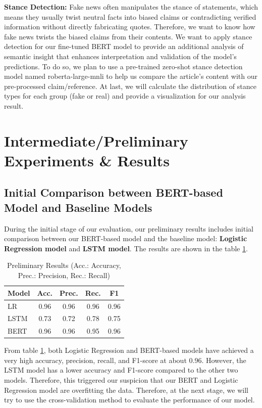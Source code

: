 \documentclass[11pt,a4paper]{article}
\begin{document}
\textbf{Stance Detection:} 
Fake news often manipulates the stance of statements, which means they usually twist neutral facts into biased claims or contradicting verified information without directly fabricating quotes. Therefore, we want to know how fake news twists the biased claims from their contents. We want to apply stance detection for our fine-tuned BERT model to provide an additional analysis of semantic insight that enhances interpretation and validation of the model's predictions.
To do so, we plan to use a pre-trained zero-shot stance detection model named  roberta-large-mnli to help us compare the article's content with our pre-processed claim/reference.
At last, we will calculate the distribution of stance types for each group (fake or real) and provide a visualization for our analysis result.


\section{Intermediate/Preliminary Experiments \& Results}

\subsection{Initial Comparison between BERT-based Model and Baseline Models}
During the initial stage of our evaluation, our preliminary results includes initial comparison between our BERT-based model and the baseline model: \textbf{Logistic Regression model} and \textbf{LSTM model}. The results are shown in the table \ref{tab:preliminary_results}.

\begin{table}[h]
    \centering
    \small
    \begin{tabular}{lcccc}
        \toprule
        Model & Acc. & Prec. & Rec. & F1 \\
        \midrule
        LR & 0.96 & 0.96 & 0.96 & 0.96 \\
        LSTM & 0.73 & 0.72 & 0.78 & 0.75 \\
        BERT & 0.96 & 0.96 & 0.95 & 0.96 \\
        \bottomrule
    \end{tabular}
    \caption{Preliminary Results (Acc.: Accuracy, Prec.: Precision, Rec.: Recall)}
    \label{tab:preliminary_results}
\end{table}

From table \ref{tab:preliminary_results}, both Logistic Regression and BERT-based models have achieved a very high accuracy, precision, recall, and F1-score at about 0.96. However, the LSTM model has a lower accuracy and F1-score compared to the other two models.
Therefore, this triggered our suspicion that our BERT and Logistic Regression model are overfitting the data. Therefore, at the next stage, we will try to use the cross-validation method to evaluate the performance of our model.
\end{document}
